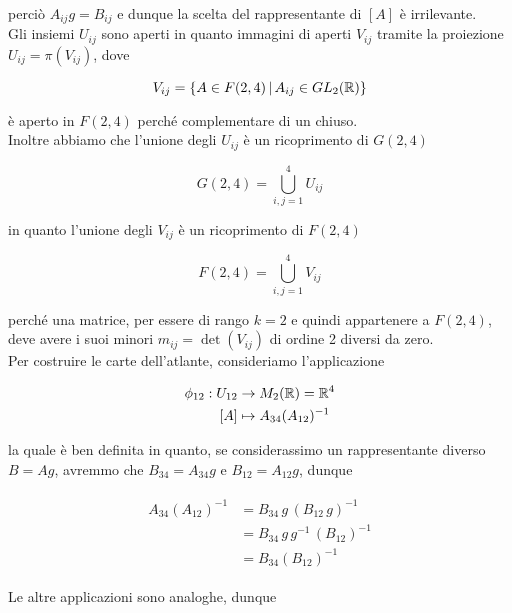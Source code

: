 perciò $ A_{ij} g = B_{ij} $ e dunque la scelta del rappresentante di $ [A] $ è irrilevante.\\
Gli insiemi $ U_{ij} $ sono aperti in quanto immagini di aperti $ V_{ij} $ tramite la proiezione $ U_{ij} = \pi(V_{ij}) $, dove

\begin{equation}
	V_{ij} = \left\{ A \in F(2,4) \, \middle| \, A_{ij} \in GL_{2}(\mathbb{R}) \right\}
\end{equation}

è aperto in $ F(2,4) $ perché complementare di un chiuso.\\
Inoltre abbiamo che l'unione degli $ U_{ij} $ è un ricoprimento di $ G(2,4) $

\begin{equation}
	G(2,4) = \bigcup_{i,j=1}^{4} U_{ij}
\end{equation}

in quanto l'unione degli $ V_{ij} $ è un ricoprimento di $ F(2,4) $

\begin{equation}
	F(2,4) = \bigcup_{i,j=1}^{4} V_{ij}
\end{equation}

perché una matrice, per essere di rango $ k=2 $ e quindi appartenere a $ F(2,4) $, deve avere i suoi minori $ m_{ij} = \det(V_{ij}) $ di ordine 2 diversi da zero.\\
Per costruire le carte dell'atlante, consideriamo l'applicazione

\begin{align}
	\begin{split}
		\phi_{12} : U_{12} &\to M_{2}(\mathbb{R}) = \mathbb{R}^{4}\\
		[A] &\mapsto A_{34} (A_{12})^{-1}
	\end{split}
\end{align}

la quale è ben definita in quanto, se considerassimo un rappresentante diverso $ B = A g $, avremmo che $ B_{34} = A_{34} g $ e $ B_{12} = A_{12} g $, dunque

\begin{align}
	\begin{split}
		A_{34} (A_{12})^{-1} &= B_{34} \, g \, (B_{12} \, g)^{-1}\\
		&= B_{34} \, g \, g^{-1} \, (B_{12})^{-1}\\
		&= B_{34} (B_{12})^{-1}
	\end{split}
\end{align}

Le altre applicazioni sono analoghe, dunque

